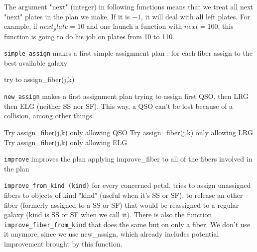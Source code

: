 \documentclass{article}
\begin{document}
The argument "next" (integer) in following functions means that we treat all next "next" plates in the plan we make. If it is $-1$, it will deal with all left plates. For example, if $next_plate = 10$ and one launch a function with $next = 100$, this function is going to do his job on plates from 10 to 110.

{\tt simple\_assign} makes a first simple assignment plan : for each fiber assign to the best available galaxy

\begin{algorithm}[H]
	\caption{Simple\_assign(j0,n)}\label{euclid}
	\begin{algorithmic}[1]
		\State try to assign\_fiber(j,k)
		\EndFor
		\EndFor
	\end{algorithmic}
\end{algorithm}

{\tt new\_assign} makes a first assignment plan trying to assign first QSO, then LRG then ELG (neither SS nor SF). This way, a QSO can't be lost because of a collision, among other things.

\begin{algorithm}[H]
	\caption{New\_assign\_fibers(j0,n)}\label{euclid}
	\begin{algorithmic}[1]
		\State Try assign\_fiber(j,k) only allowing QSO
		\EndFor
		\State Try assign\_fiber(j,k) only allowing LRG
		\EndFor
		\State Try assign\_fiber(j,k) only allowing ELG
		\EndFor
		\EndFor
		\EndFor
	\end{algorithmic}
\end{algorithm}

{\tt improve} improves the plan applying improve\_fiber to all of the fibers involved in the plan

{\tt improve\_from\_kind (kind)} for every concerned petal, tries to assign unassigned fibers to objects of kind "kind" (useful when it's SS or SF), to release an other fiber (formerly assigned to a SS or SF) that would be reassigned to a regular galaxy (kind is SS or SF when we call it). There is also the function {\tt improve\_fiber\_from\_kind} that does the same but on only a fiber. We don't use it anymore, since we use new\_assign, which already includes potential improvement brought by this function.
\end{document}
